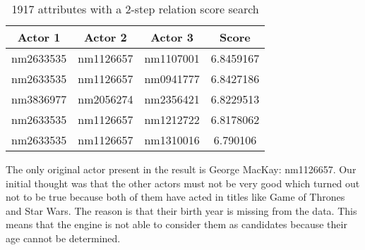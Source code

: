 \begin{table}[H]
	\centering
    \begin{tabular}{ |c|c|c|c| } 
        \hline
        \textbf{Actor 1} & \textbf{Actor 2} & \textbf{Actor 3} & \textbf{Score} \\ 
        \hline
        nm2633535 & nm1126657 & nm1107001  & 6.8459167 \\ 
        nm2633535 & nm1126657 & nm0941777  & 6.8427186 \\ 
        nm3836977 & nm2056274 & nm2356421 & 6.8229513 \\ 
        nm2633535 & nm1126657 & nm1212722  & 6.8178062 \\ 
        nm2633535 & nm1126657 & nm1310016  & 6.790106 \\ 
        \hline
    \end{tabular}
\caption{1917 attributes with a 2-step relation score search}
\label{tab:2-step relation score}
\end{table}



The only original actor present in the result is George MacKay: nm1126657. Our initial thought was that the other actors must not be very good which turned out not to be true because both of them have acted in titles like Game of Thrones and Star Wars. The reason is that their birth year is missing from the data. This means that the engine is not able to consider them as candidates because their age cannot be determined.